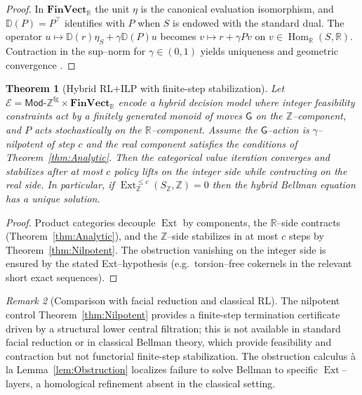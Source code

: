 \documentclass[12pt]{article}
\newcommand{\FinVect}{\mathbf{FinVect}}
\newcommand{\RR}{\mathbb{R}}
\newcommand{\E}{\mathcal{E}}
\newcommand{\Mod}{\mathsf{Mod}}
\newcommand{\ZZ}{\mathbb{Z}}
\newcommand{\DD}{\mathbb{D}}
\newcommand{\Hom}{\operatorname{Hom}}
\newcommand{\Ext}{\operatorname{Ext}}
\theoremstyle{plain}
\newtheorem{theorem}{Theorem}[section]
\theoremstyle{definition}
\theoremstyle{remark}
\newtheorem{remark}[theorem]{Remark}
\numberwithin{equation}{section}
\begin{document}
\begin{proof}
In $\FinVect_{\RR}$ the unit $\eta$ is the canonical evaluation isomorphism, and $\DD(P)=P^\top$ identifies with $P$ when $S$ is endowed with the standard dual. The operator $u\mapsto \DD(r)\eta_S+\gamma\DD(P)u$ becomes $v\mapsto r+\gamma Pv$ on $v\in\Hom_{\RR}(S,\RR)$. Contraction in the sup–norm for $\gamma\in(0,1)$ yields uniqueness and geometric convergence \cite{BertsekasTsitsiklis1996,Puterman1994}.
\end{proof}

\begin{theorem}[Hybrid RL+ILP with finite-step stabilization]\label{thm:Hybrid}
Let $\E=\Mod\text{-}\ZZ^{\mathrm{fg}}\times \FinVect_{\RR}$ encode a hybrid decision model where integer feasibility constraints act by a finitely generated monoid of moves $\mathsf G$ on the $\ZZ$–component, and $P$ acts stochastically on the $\RR$–component. Assume the $\mathsf G$–action is $\gamma$–nilpotent of step $c$ and the real component satisfies the conditions of Theorem~\ref{thm:Analytic}. Then the categorical value iteration converges and stabilizes after at most $c$ policy lifts on the integer side while contracting on the real side. In particular, if $\Ext^{\le c}_{\ZZ}(S_{\ZZ},\ZZ)=0$ then the hybrid Bellman equation has a unique solution.
\end{theorem}

\begin{proof}
Product categories decouple $\Ext$ by components, the $\RR$–side contracts (Theorem~\ref{thm:Analytic}), and the $\ZZ$–side stabilizes in at most $c$ steps by Theorem~\ref{thm:Nilpotent}. The obstruction vanishing on the integer side is ensured by the stated Ext–hypothesis (e.g.\ torsion–free cokernels in the relevant short exact sequences).
\end{proof}

\begin{remark}[Comparison with facial reduction and classical RL]
The nilpotent control Theorem~\ref{thm:Nilpotent} provides a finite-step termination certificate driven by a structural lower central filtration; this is not available in standard facial reduction or in classical Bellman theory, which provide feasibility and contraction but not functorial finite-step stabilization. The obstruction calculus \`a la Lemma~\ref{lem:Obstruction} localizes failure to solve Bellman to specific $\Ext$–layers, a homological refinement absent in the classical setting.
\end{remark}
\end{document}
